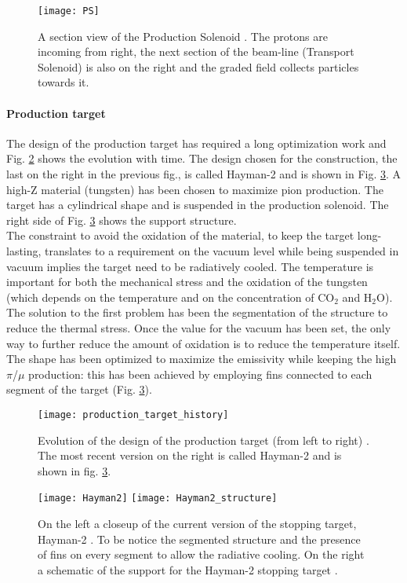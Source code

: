\documentclass[12pt,a4paper,openright, oneside, titlepage]{book} %
\begin{document}
\begin{figure}[h!]
\centering
\texttt{[image: PS]}
\caption{A section view of the Production Solenoid \cite{PS}. The protons are incoming from right, the next section of the beam-line (Transport Solenoid) is also on the right and the graded field collects particles towards it.}
\label{_PS}
\end{figure}

\paragraph{Production target}
The design of the production target has required a long optimization work and Fig.  \ref{_production_target_history} shows  the evolution with time.
The design chosen for the construction, the last on the right in the previous fig., is called Hayman-2 and is shown in Fig. \ref{_Hayman2}.
A high-Z material (tungsten) has been chosen to maximize pion production. 
The target has a cylindrical shape and is suspended in the production solenoid.
The right side of Fig. \ref{_Hayman2} shows the support structure.\\
The constraint to avoid the oxidation of the material, to keep the target long-lasting, translates to a requirement on the vacuum level while being suspended in vacuum implies the target need to be radiatively cooled.
The temperature is important for both the mechanical stress and the oxidation of the tungsten (which depends on the temperature and on the concentration of CO$_2$ and H$_2$O).
The solution to the first problem has been the segmentation of the structure to reduce the thermal stress. 
Once the value for the vacuum has been set, the only way to further reduce the amount of oxidation is to reduce the temperature itself. The shape has been optimized to maximize the emissivity while keeping the high $\pi$/$\mu$ production: this has been achieved by employing fins connected to each segment of the target (Fig. \ref{_Hayman2}).

\begin{figure}[h!]
\centering
\texttt{[image: production\_target\_history]}
\caption{Evolution of the design of the production target (from left to right) \cite{Pushka_Hayman2}. 
The most recent version on the right is called Hayman-2 and is shown in fig. \ref{_Hayman2}.}
\label{_production_target_history}
\end{figure}

\begin{figure}[h!]
\centering
\texttt{[image: Hayman2]}\hfill
\texttt{[image: Hayman2\_structure]}
\caption{On the left a closeup of the current version of the stopping target, Hayman-2 \cite{Pushka_Hayman2} \cite{bob_Hayman2}. To be notice the segmented structure and the presence of fins on every segment to allow the radiative cooling. On the right a schematic of the support for the Hayman-2 stopping target \cite{Pushka_Hayman2}.}
\label{_Hayman2}
\end{figure}
\end{document}
